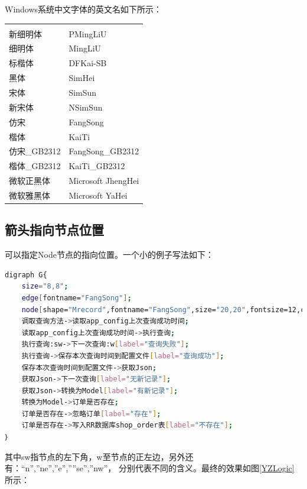 \documentclass{book}
\begin{document}
Windows系统中文字体的英文名如下所示：

\begin{tabular}{ll}
	\multirow{1}{*}{}			
	& \multicolumn{1}{c}{}\\
	新细明体 & PMingLiU\\
	细明体 & MingLiU\\	
	标楷体 & DFKai-SB\\
	黑体 & SimHei\\
	宋体 & SimSun\\
	新宋体 & NSimSun\\
	仿宋 & FangSong\\
	楷体 & KaiTi\\
	仿宋\_GB2312 & FangSong\_GB2312\\	
	楷体\_GB2312 & KaiTi\_GB2312\\
	微软正黑体 & Microsoft JhengHei\\
	微软雅黑体 & Microsoft YaHei\\				
\end{tabular}

\subsection{箭头指向节点位置}

可以指定Node节点的指向位置。一个小的例子写法如下：

\begin{lstlisting}[language=Bash]
digraph G{
	size="8,8";
	edge[fontname="FangSong"];
	node[shape="Mrecord",fontname="FangSong",size="20,20",fontsize=12,color="skyblue",style="filled"]
	调取查询方法->读取app_config上次查询成功时间;	
	读取app_config上次查询成功时间->执行查询;				
	执行查询:sw->下一次查询:w[label="查询失败"];	
	执行查询->保存本次查询时间到配置文件[label="查询成功"];
	保存本次查询时间到配置文件->获取Json;
	获取Json->下一次查询[label="无新记录"];	
	获取Json->转换为Model[label="有新记录"];
	转换为Model->订单是否存在;
	订单是否存在->忽略订单[label="存在"];
	订单是否存在->写入RR数据库shop_order表[label="不存在"];			
｝
\end{lstlisting}

其中sw指节点的左下角，w至节点的正左边，另外还有：“n”,”ne”,”e”,””se”,”nw”，
分别代表不同的含义。最终的效果如图\ref{YZLogic}所示：
\end{document}
